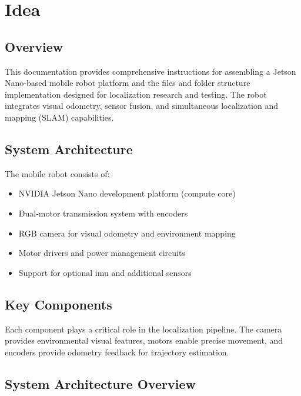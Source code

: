 %
%

\chapter{Idea}

\section{Overview}
This documentation provides comprehensive instructions for assembling a Jetson Nano-based mobile robot platform and the files and folder structure implementation designed for localization research and testing. The robot integrates visual odometry, sensor fusion, and simultaneous localization and mapping (SLAM) capabilities.

\section{System Architecture}
The mobile robot consists of:
\begin{itemize}
    \item NVIDIA Jetson Nano development platform (compute core)
    \item Dual-motor transmission system with encoders
    \item RGB camera for visual odometry and environment mapping
    \item Motor drivers and power management circuits
    \item Support for optional \acs{imu} and additional sensors
\end{itemize}

\section{Key Components}
Each component plays a critical role in the localization pipeline. The camera provides environmental visual features, motors enable precise movement, and encoders provide odometry feedback for trajectory estimation.

\section{System Architecture Overview}

